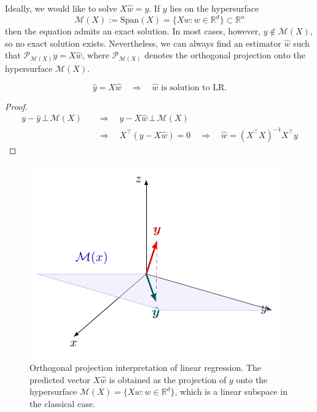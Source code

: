 \documentclass[../main]{subfiles}
\begin{document}
Ideally, we would like to solve $X \hat w = y.$ If $y$ lies on the hypersurface 
\begin{equation}
  \mathcal{M}(X) :=\mathrm{Span}(X)= \{ X w : w \in \mathbb{R}^d \} \subset \mathbb{R}^n
\end{equation}
then the equation admits an exact solution. In most cases, however, $y \notin \mathcal{M}(X)$, so no exact solution exists. Nevertheless, we can always find an estimator $\hat w$ such that $\mathcal P_{\mathcal{M}(X)} y = X \hat w$, where $\mathcal P_{\mathcal{M}(X)}$ denotes the orthogonal projection onto the hypersurface $\mathcal{M}(X)$.
\begin{proposition}
  \begin{equation}
      \hat y=X\hat w\quad\Rightarrow\quad\hat w \text{ is solution to LR.}
  \end{equation}
\end{proposition}
\begin{proof}
  \begin{align*}
    y-\hat y\,\bot\, \mathcal{M}(X)\quad&\Rightarrow\quad y-X\hat w\,\bot\, \mathcal{M}(X)\\
    &\Rightarrow\quad X^\top(y-X\hat w)=0\quad\Rightarrow\quad \hat w=(X^\top X)^{-1}X^{\top}y
  \end{align*}
\end{proof}
\begin{figure}[H]
  \centering
  \includegraphics{../../tikz/1/3.pdf}
  \caption{Orthogonal projection interpretation of linear regression. 
The predicted vector $X\hat w$ is obtained as the projection of $y$ onto the hypersurface 
$\mathcal M(X)=\{Xw : w\in\mathbb{R}^d\}$, which is a linear subspace in the classical case.}
\end{figure}
\end{document}
